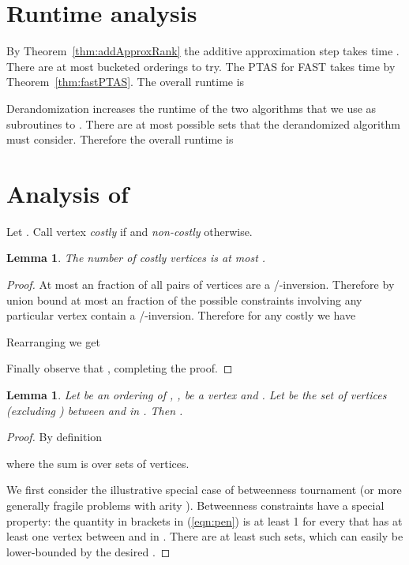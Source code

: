 \documentclass[dvips,11pt,letter]{article}
\newtheorem{lemma}[theorem]{Lemma}
\begin{document}
{\section{Runtime analysis} \label{sec:runtime}

By Theorem~\ref{thm:addApproxRank} the additive approximation step takes time . There are at most  bucketed orderings  to try. The PTAS for FAST takes time  by Theorem~\ref{thm:fastPTAS}. The overall runtime is 


Derandomization increases the runtime of the two algorithms that we use as subroutines to . There are at most  possible sets  that the derandomized algorithm must consider. Therefore the overall runtime is 


\section{Analysis of } \label{sec:sigmaOne}

Let .
Call vertex  \emph{costly} if  and \emph{non-costly} otherwise.

\begin{lemma}\label{lem:fewCostly}
The number of costly vertices is at most .
\end{lemma}

\begin{proof}At most an  fraction of all pairs of vertices are a /-inversion. Therefore by union bound at most an  fraction of the  possible constraints involving any particular vertex  contain a /-inversion. Therefore for any costly  we have

Rearranging we get


Finally observe that , completing the proof.
\end{proof}

\begin{lemma}\label{lem:fragile} Let  be an ordering of , ,  be a vertex and .
Let  be the set of vertices (excluding ) between  and  in . 
Then
. 
\end{lemma}

\begin{proof}By definition

where the sum is over sets  of  vertices.

We first consider the illustrative special case of betweenness tournament (or more generally fragile problems with arity ). Betweenness constraints have a special property: the quantity in brackets in (\ref{eqn:pen}) is at least 1 for every  that has at least one vertex between  and  in . There are at least  such sets, which can easily be lower-bounded by the desired .


\end{proof}}
\end{document}
